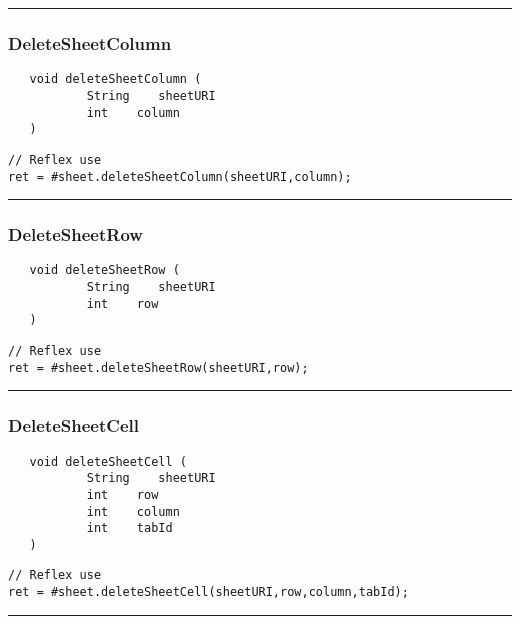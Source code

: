 \rule{15cm}{2pt}
\subsubsection{DeleteSheetColumn}
\label{Api:DeleteSheetColumn}
\begin{verbatim}
   void deleteSheetColumn (
           String    sheetURI
           int    column
   )
\end{verbatim}
\begin{lstlisting}[language=reflex]
// Reflex use
ret = #sheet.deleteSheetColumn(sheetURI,column);
\end{lstlisting}



\rule{15cm}{2pt}
\subsubsection{DeleteSheetRow}
\label{Api:DeleteSheetRow}
\begin{verbatim}
   void deleteSheetRow (
           String    sheetURI
           int    row
   )
\end{verbatim}
\begin{lstlisting}[language=reflex]
// Reflex use
ret = #sheet.deleteSheetRow(sheetURI,row);
\end{lstlisting}



\rule{15cm}{2pt}
\subsubsection{DeleteSheetCell}
\label{Api:DeleteSheetCell}
\begin{verbatim}
   void deleteSheetCell (
           String    sheetURI
           int    row
           int    column
           int    tabId
   )
\end{verbatim}
\begin{lstlisting}[language=reflex]
// Reflex use
ret = #sheet.deleteSheetCell(sheetURI,row,column,tabId);
\end{lstlisting}



\rule{15cm}{2pt}
